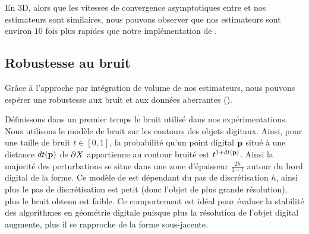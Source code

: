 En 3D, alors que les vitesses de convergence asymptotiques entre \JetFitting et
nos estimateurs sont similaires, nous pouvons observer que nos estimateurs sont
environ $10$ fois plus rapides que notre implémentation de \JetFitting.
%
\subsection{Robustesse au bruit}
\label{sec:kanungo-noise}
%
Grâce à l'approche par intégration de volume de nos estimateurs, nous pouvons
espérer une robustesse aux bruit et aux données aberrantes ().


Définissons dans un premier temps le bruit utilisé dans nos expérimentations.
Nous utilisons le modèle de bruit \Kanungo \cite{Kanungo1996} sur les contours
des objets digitaux. Ainsi, pour une taille de bruit $t \in [0,1]$, la
probabilité qu'un point digital $\mathbf{p}$ situé à une distance $dt(\mathbf{p})$ de $\partial X$
appartienne au contour bruité est $t^{1+dt(\mathbf{p})}$. Ainsi la majorité des
perturbations se situe dans une zone d'épaisseur $\frac{2h}{1-t}$ autour du bord
digital de la forme. Ce modèle de \Kanungo est dépendant du pas de
discrétisation $h$, ainsi plus le pas de discrétisation est petit (donc l'objet
de plus grande résolution), plus le bruit obtenu est faible. Ce comportement est
idéal pour évaluer la stabilité des algorithmes en géométrie digitale
\cite{Kerautret2012} puisque plus la résolution de l'objet digital augmente,
plus il se rapproche de la forme sous-jacente.


